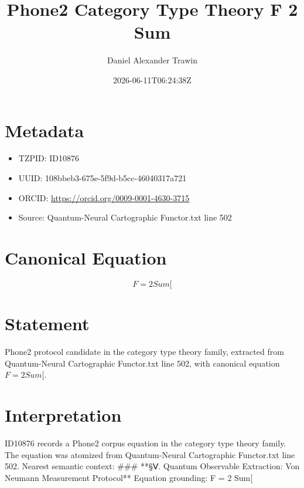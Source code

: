 \documentclass[11pt]{article}
\title{Phone2 Category Type Theory F 2 Sum}
\author{Daniel Alexander Trawin}
\date{2026-06-11T06:24:38Z}
\begin{document}
\maketitle
\section*{Metadata}
\begin{itemize}
\item TZPID: ID10876
\item UUID: 108bbeb3-675e-5f9d-b5cc-46040317a721
\item ORCID: \url{https://orcid.org/0009-0001-4630-3715}
\item Source: Quantum-Neural Cartographic Functor.txt line 502
\end{itemize}
\section*{Canonical Equation}
\[
F = 2 Sum[
\]
\section*{Statement}
Phone2 protocol candidate in the category type theory family, extracted from Quantum-Neural Cartographic Functor.txt line 502, with canonical equation $F = 2 Sum[$.
\section*{Interpretation}
ID10876 records a Phone2 corpus equation in the category type theory family. The equation was atomized from Quantum-Neural Cartographic Functor.txt line 502. Nearest semantic context: ### **§Ⅴ. Quantum Observable Extraction: Von Neumann Measurement Protocol** Equation grounding: F = 2 Sum[
\end{document}
